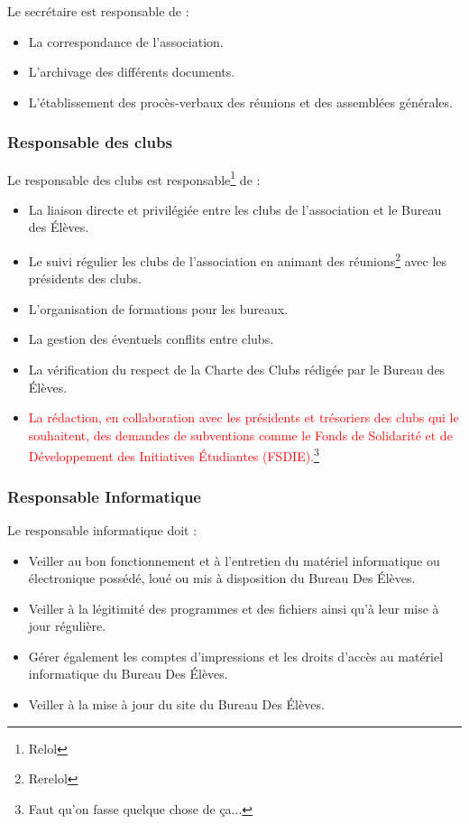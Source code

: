 \documentclass{article} %
\begin{document}
				Le secrétaire est responsable de :
				\begin{itemize}
					\item La correspondance de l’association.
					\item L’archivage des différents documents.
					\item L’établissement des procès-verbaux des réunions et des
						assemblées générales.
				\end{itemize}

			\subsubsection{Responsable des clubs}

				Le responsable des clubs est responsable\footnote{Relol} de :
				\begin{itemize}
					\item La liaison directe et privilégiée entre les clubs de
						l’association et le Bureau des Élèves.
					\item Le suivi régulier les clubs de l’association en
						animant des réunions\footnote{Rerelol} avec les
						présidents des clubs.
					\item L’organisation de formations pour les bureaux.
					\item La gestion des éventuels conflits entre clubs.
					\item La vérification du respect de la Charte des Clubs
						rédigée par le Bureau des Élèves.
					\item \textcolor{red}{La rédaction, en collaboration avec
						les présidents et trésoriers des clubs qui le
						souhaitent, des demandes de subventions comme le Fonds
						de Solidarité et de Développement des Initiatives
						Étudiantes (FSDIE).}\footnote{Faut qu'on fasse quelque
						chose de ça...}
				\end{itemize}

			\subsubsection{Responsable Informatique}
				
				Le responsable informatique doit :
				\begin{itemize}
					\item Veiller au bon fonctionnement et à l’entretien du
						matériel informatique ou électronique possédé, loué ou
						mis à disposition du Bureau Des Élèves.
					\item Veiller à la légitimité des programmes et des fichiers
						ainsi qu’à leur mise à jour régulière.
					\item Gérer également les comptes d’impressions et les
						droits d’accès au matériel informatique du Bureau Des
						Élèves.
					\item Veiller à la mise à jour du site du Bureau Des Élèves.
				\end{itemize}
\end{document}
